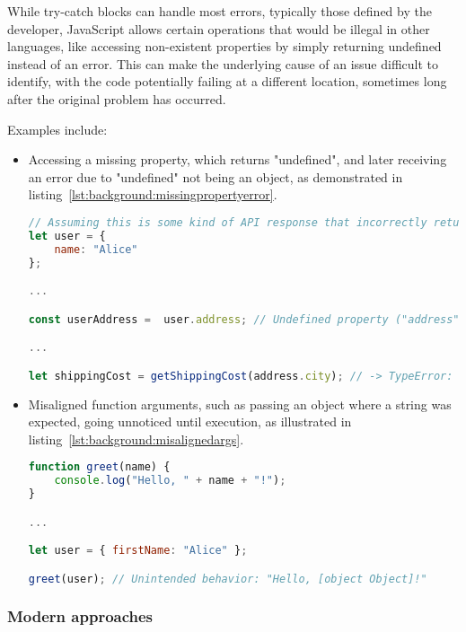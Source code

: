 While try-catch blocks can handle most errors, typically those defined by the developer, JavaScript allows certain operations that would be illegal in other languages, like accessing non-existent properties by simply returning undefined instead of an error. This can make the underlying cause of an issue difficult to identify, with the code potentially failing at a different location, sometimes long after the original problem has occurred.

Examples include:

\begin{itemize}
    \item{
		Accessing a missing property, which returns "undefined", and later receiving an error due to "undefined" not being an object, as demonstrated in listing~\ref{lst:background:missingpropertyerror}.

		\begin{lstlisting}[language=JavaScript,caption=Accessing a missing property returns undefined which later causes an error,label=lst:background:missingpropertyerror]
// Assuming this is some kind of API response that incorrectly returned some data
let user = {
	name: "Alice"
};

...

const userAddress =  user.address; // Undefined property ("address" does not exist), returns simply "undefined"

...

let shippingCost = getShippingCost(address.city); // -> TypeError: Cannot read property "city" of undefined
		\end{lstlisting}
	}
	\item{
		Misaligned function arguments, such as passing an object where a string was expected, going unnoticed until execution, as illustrated in listing~\ref{lst:background:misalignedargs}.

		\begin{lstlisting}[language=JavaScript,caption=Misaligned function arguments going unnoticed,label=lst:background:misalignedargs]
function greet(name) {
	console.log("Hello, " + name + "!");
}

...

let user = { firstName: "Alice" };

greet(user); // Unintended behavior: "Hello, [object Object]!"
		\end{lstlisting}
	}
\end{itemize}

\subsubsection{Modern approaches}

